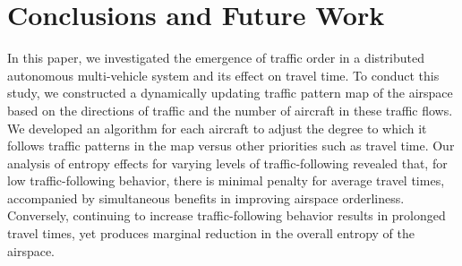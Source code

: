 \documentclass[conference, letter]{IEEEtran}
\newcommand{\aj}[1]{ \textcolor{blue}{\textsc{AJ:} #1  }}
\begin{document}


\section{Conclusions and Future Work}\label{sec:future}

In this paper, we investigated the emergence of traffic order in a distributed autonomous multi-vehicle system and its effect on travel time. To conduct this study, we constructed a dynamically updating traffic pattern map of the airspace based on the directions of traffic and the number of aircraft in these traffic flows. We developed an algorithm for each aircraft to adjust the degree to which it follows traffic patterns in the map versus other priorities such as travel time. Our analysis of entropy effects for varying levels of traffic-following revealed that, for low traffic-following behavior, there is minimal penalty for average travel times, accompanied by simultaneous benefits in improving airspace orderliness. Conversely, continuing to increase traffic-following behavior results in prolonged travel times, yet produces marginal reduction in the overall entropy of the airspace. 
\end{document}
